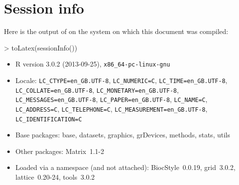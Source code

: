 \documentclass[11pt, a4paper, oneside]{article}
\begin{document}
\section{Session info}
Here is the output of  on the system on which
this document was compiled:
\begin{Schunk}
\begin{Sinput}
> toLatex(sessionInfo())
\end{Sinput}
\begin{itemize}\raggedright
  \item R version 3.0.2 (2013-09-25), \verb|x86_64-pc-linux-gnu|
  \item Locale: \verb|LC_CTYPE=en_GB.UTF-8|, \verb|LC_NUMERIC=C|, \verb|LC_TIME=en_GB.UTF-8|, \verb|LC_COLLATE=en_GB.UTF-8|, \verb|LC_MONETARY=en_GB.UTF-8|, \verb|LC_MESSAGES=en_GB.UTF-8|, \verb|LC_PAPER=en_GB.UTF-8|, \verb|LC_NAME=C|, \verb|LC_ADDRESS=C|, \verb|LC_TELEPHONE=C|, \verb|LC_MEASUREMENT=en_GB.UTF-8|, \verb|LC_IDENTIFICATION=C|
  \item Base packages: base, datasets, graphics, grDevices, methods, stats,
    utils
  \item Other packages: Matrix~1.1-2
  \item Loaded via a namespace (and not attached): BiocStyle~0.0.19, grid~3.0.2,
    lattice~0.20-24, tools~3.0.2
\end{itemize}\end{Schunk}


%
%



\end{document}
